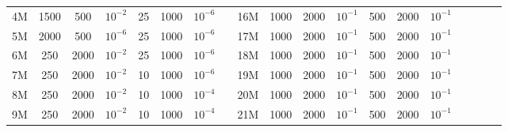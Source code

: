 \begin{table}[h]
{\begin{tabular}{@{}cccccccccccccccllll@{}}
    \multicolumn{1}{c|}{4M}  & 1500         & 500         & \multicolumn{1}{c|}{$10^{-2}$} & 25            & 1000               & $10^{-6}$   &                      & \multicolumn{1}{c|}{16M} & 1000        & 2000         & \multicolumn{1}{c|}{$10^{-1}$} & 500           & 2000           & $10^{-1}$   &                               &                               &                      &                      \\
    \multicolumn{1}{c|}{5M}  & 2000         & 500          & \multicolumn{1}{c|}{$10^{-6}$} & 25            & 1000                & $10^{-6}$   &                      & \multicolumn{1}{c|}{17M} & 1000        & 2000         & \multicolumn{1}{c|}{$10^{-1}$} & 500           & 2000            & $10^{-1}$   &                               &                               &                      &                      \\
    \multicolumn{1}{c|}{6M}  & 250         & 2000        & \multicolumn{1}{c|}{$10^{-2}$} & 25           & 1000           & $10^{-6}$   &                      & \multicolumn{1}{c|}{18M} & 1000        & 2000         & \multicolumn{1}{c|}{$10^{-1}$} & 500           & 2000            & $10^{-1}$   &                               &                               &                      &                      \\
    \multicolumn{1}{c|}{7M}  & 250         & 2000           & \multicolumn{1}{c|}{$10^{-2}$} & 10           & 1000           & $10^{-6}$   &                      & \multicolumn{1}{c|}{19M} & 1000       & 2000         & \multicolumn{1}{c|}{$10^{-1}$} & 500           & 2000            & $10^{-1}$   &                               &                               &                      &                      \\
    \multicolumn{1}{c|}{8M}  & 250         & 2000         & \multicolumn{1}{c|}{$10^{-2}$} & 10         & 1000           & $10^{-4}$   &                      & \multicolumn{1}{c|}{20M} & 1000        & 2000         & \multicolumn{1}{c|}{$10^{-1}$} & 500          & 2000          & $10^{-1}$   &                               &                               &                      &                      \\
    \multicolumn{1}{c|}{9M}  & 250         & 2000         & \multicolumn{1}{c|}{$10^{-2}$} & 10           & 1000           & $10^{-4}$   &                      & \multicolumn{1}{c|}{21M} & 1000       & 2000         & \multicolumn{1}{c|}{$10^{-1}$} & 500          & 2000            & $10^{-1}$   &                               &                               &                      &                      \\

\end{tabular}}
\end{table}
